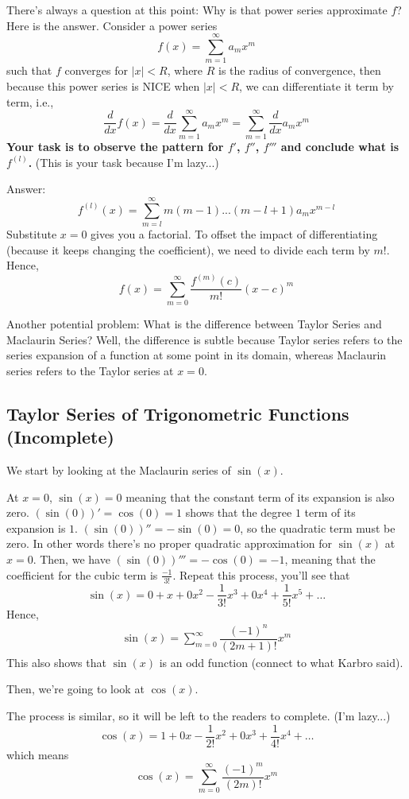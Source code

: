 \documentclass{article}
\theoremstyle{definition}
\theoremstyle{definition}
\theoremstyle{definition}
\theoremstyle{definition}
\theoremstyle{definition}
\theoremstyle{definition}
\theoremstyle{definition}
\theoremstyle{definition}
\theoremstyle{definition}
\begin{document}
There's always a question at this point: Why is that power series approximate $f$? Here is the answer.
Consider a power series
\[f(x)=\sum_{m=1}^\infty a_mx^m\]
such that $f$ converges for $|x|<R$, where $R$ is the radius of convergence, then because this power series is NICE when $|x|<R$, we can differentiate it term by term, i.e.,
\[\dfrac{d}{dx}f(x)=\dfrac{d}{dx}\sum_{m=1}^\infty a_mx^m=\sum_{m=1}^\infty\dfrac{d}{dx} a_mx^m\]
\textbf{Your task is to observe the pattern for $f'$, $f''$, $f'''$ and conclude what is $f^{(l)}$.} (This is your task because I'm lazy...)

Answer:
\[
f^{(l)}(x)=\sum_{m=l}^\infty m(m-1)...(m-l+1)a_mx^{m-l}
\]
Substitute $x=0$ gives you a factorial. To offset the impact of differentiating (because it keeps changing the coefficient), we need to divide each term by $m!$. Hence,
\[f(x)=\sum_{m=0}^\infty\dfrac{f^{(m)}(c)}{m!}(x-c)^m\]

Another potential problem: What is the difference between Taylor Series and Maclaurin Series? Well, the difference is subtle because Taylor series refers to the series expansion of a function at some point in its domain, whereas Maclaurin series refers to the Taylor series at $x=0$.

\subsection{Taylor Series of Trigonometric Functions (Incomplete)}
We start by looking at the Maclaurin series of $\sin(x)$.

At $x=0$, $\sin(x)=0$ meaning that the constant term of its expansion is also zero. $(\sin(0))'=\cos(0)=1$ shows that the degree $1$ term of its expansion is $1$. $(\sin(0))''=-\sin(0)=0$, so the quadratic term must be zero. In other words there's no proper quadratic approximation for $\sin(x)$ at $x=0$. Then, we have $(\sin(0))'''=-\cos(0)=-1$, meaning that the coefficient for the cubic term is $\frac{-1}{3!}$. Repeat this process, you'll see that 
\[\sin(x)=0+x+0x^2-\dfrac{1}{3!}x^3+0x^4+\frac{1}{5!}x^5+\ldots\]
Hence,
\begin{align*}
    \sin(x)=\sum_{m=0}^\infty\dfrac{(-1)^n}{(2m+1)!}x^m
\end{align*}
This also shows that $\sin(x)$ is an odd function (connect to what Karbro said).

Then, we're going to look at $\cos(x)$.

The process is similar, so it will be left to the readers to complete. (I'm lazy...)
\[
\cos(x)=1+0x-\dfrac{1}{2!}x^2+0x^3+\dfrac{1}{4!}x^4+\ldots
\]
which means
\[
\cos(x)=\sum_{m=0}^\infty\dfrac{(-1)^m}{(2m)!}x^m
\]
\end{document}
